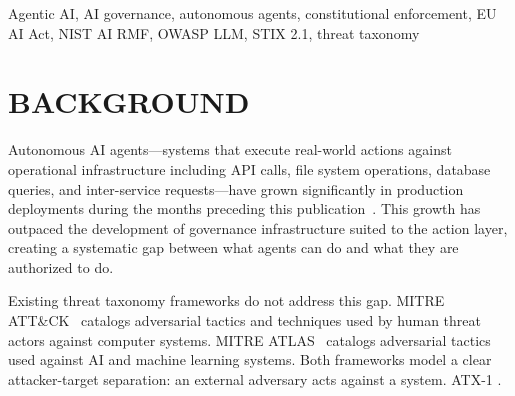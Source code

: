 \documentclass{IEEEoj-data}
\begin{document}
\begin{abstract}
{\textcolor{ieeedata}{\abstractheadfont\bfseries{DATA TYPE/LOCATION}}} Threat Taxonomy; Online (IEEE DataPort, Zenodo, aegis-governance.com)
\end{abstract}

\begin{IEEEkeywords}
Agentic AI, AI governance, autonomous agents, constitutional enforcement, EU AI Act, NIST AI RMF, OWASP LLM, STIX 2.1, threat taxonomy
\end{IEEEkeywords}

\maketitle

\section*{BACKGROUND}

Autonomous AI agents---systems that execute real-world actions against operational infrastructure including API calls, file system operations, database queries, and inter-service requests---have grown significantly in production deployments during the  months preceding this publication~\cite{ref1}. This growth has outpaced the development of governance infrastructure suited to the action layer, creating a systematic gap between what agents can do and what they are authorized to do.

Existing threat taxonomy frameworks do not address this gap. MITRE ATT\&CK~\cite{ref2} catalogs adversarial tactics and techniques used by human threat actors against computer systems. MITRE ATLAS~\cite{ref3} catalogs adversarial tactics used against AI and machine learning systems. Both frameworks model a clear attacker-target separation: an external adversary acts against a system. ATX-1 . 
\end{document}
